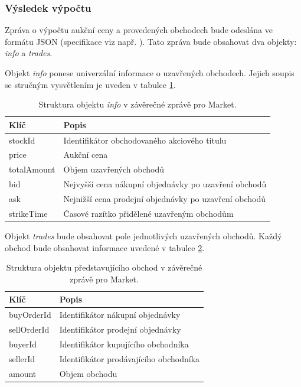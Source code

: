 \documentclass[thesis=M,czech]{FITthesis}[2012/06/26]
\begin{document}
\subsubsection{Výsledek výpočtu}

Zpráva o výpočtu aukční ceny a provedených obchodech bude odeslána ve formátu JSON (specifikace viz např. \cite{json}). 
Tato zpráva bude obsahovat dva objekty: \textit{info} a \textit{trades}.

Objekt \textit{info} ponese univerzální informace o uzavřených obchodech. Jejich soupis se stručným vysvětlením je uveden 
v tabulce \ref{tab:jsoninfo}.

\begin{table}\centering
	\begin{tabular}{| l | l |}\hline
		Klíč		& Popis								\tabularnewline \hline \hline
		stockId 	& Identifikátor obchodovaného akciového titulu		\tabularnewline \hline
		price	 	& Aukční cena							\tabularnewline \hline
		totalAmount	& Objem uzavřených obchodů 					\tabularnewline \hline
		bid		& Nejvyšší cena nákupní objednávky po uzavření obchodů 	\tabularnewline \hline
		ask		& Nejnižší cena prodejní objednávky po uzavření obchodů 	\tabularnewline \hline
		strikeTime	& Časové razítko přidělené uzavřeným obchodům		\tabularnewline \hline
	\end{tabular}
	\caption[Struktura objektu \textit{info}]{Struktura objektu \textit{info} v závěrečné zprávě pro Market.}
	\label{tab:jsoninfo}
\end{table}


Objekt \textit{trades} bude obsahovat pole jednotlivých uzavřených obchodů. Každý obchod bude obsahovat informace 
uvedené v tabulce \ref{tab:jsontrade}.

\begin{table}\centering
	\begin{tabular}{| l | l |}\hline
		Klíč		& Popis						\tabularnewline \hline \hline
		buyOrderId 	& Identifikátor nákupní objednávky		\tabularnewline \hline
		sellOrderId	& Identifikátor prodejní objednávky		\tabularnewline \hline
		buyerId	& Identifikátor kupujícího obchodníka		\tabularnewline \hline
		sellerId	& Identifikátor prodávajícího obchodníka	\tabularnewline \hline
		amount	& Objem obchodu					\tabularnewline \hline
	\end{tabular}
	\caption[Struktura informace o obchodu]{Struktura objektu představujícího obchod v závěrečné zprávě pro Market.}
	\label{tab:jsontrade}
\end{table}
\end{document}
